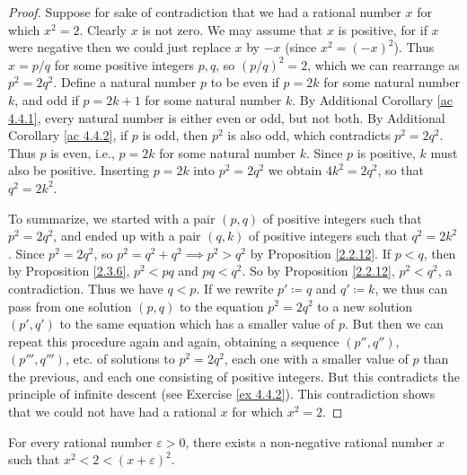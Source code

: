 \begin{proof}
Suppose for sake of contradiction that we had a rational number \(x\) for which \(x^2 = 2\).
Clearly \(x\) is not zero.
We may assume that \(x\) is positive, for if \(x\) were negative then we could just replace \(x\) by \(-x\)
(since \(x^2 = (-x)^2\)).
Thus \(x = p / q\) for some positive integers \(p, q\), so \((p / q)^2 = 2\), which we can rearrange as \(p^2 = 2q^2\).
Define a natural number \(p\) to be even if \(p = 2k\) for some natural number \(k\), and odd if \(p = 2k + 1\) for some natural number \(k\).
By Additional Corollary \ref{ac 4.4.1}, every natural number is either even or odd, but not both.
By Additional Corollary \ref{ac 4.4.2}, if \(p\) is odd, then \(p^2\) is also odd, which contradicts \(p^2 = 2q^2\).
Thus \(p\) is even, i.e., \(p = 2k\) for some natural number \(k\).
Since \(p\) is positive, \(k\) must also be positive.
Inserting \(p = 2k\) into \(p^2 = 2q^2\) we obtain \(4k^2 = 2q^2\), so that \(q^2 = 2k^2\).

To summarize, we started with a pair \((p, q)\) of positive integers such that \(p^2 = 2q^2\), and ended up with a pair \((q, k)\) of positive integers such that \(q^2 = 2k^2\).
Since \(p^2 = 2q^2\), so \(p^2 = q^2 + q^2 \implies p^2 > q^2\) by Proposition \ref{2.2.12}.
If \(p < q\), then by Proposition \ref{2.3.6}, \(p^2 < pq\) and \(pq < q^2\).
So by Proposition \ref{2.2.12}, \(p^2 < q^2\), a contradiction.
Thus we have \(q < p\).
If we rewrite \(p' \coloneqq q\) and \(q' \coloneqq k\), we thus can pass from one solution \((p, q)\) to the equation \(p^2 = 2q^2\) to a new solution \((p', q')\) to the same equation which has a smaller value of \(p\).
But then we can repeat this procedure again and again, obtaining a sequence \((p'', q'')\), \((p''', q''')\), etc. of solutions to \(p^2 = 2q^2\), each one with a smaller value of \(p\) than the previous, and each one consisting of positive integers.
But this contradicts the principle of infinite descent (see Exercise \ref{ex 4.4.2}).
This contradiction shows that we could not have had a rational \(x\) for which \(x^2 = 2\).
\end{proof}

\begin{proposition}\label{4.4.5}
For every rational number \(\varepsilon > 0\), there exists a non-negative rational number \(x\) such that \(x^2 < 2 < (x + \varepsilon)^2\).
\end{proposition}

